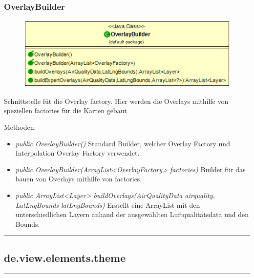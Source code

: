 \subsubsection{OverlayBuilder}
\begin{minipage}{0.5\textwidth}
    \begin{figure}[H]
        {\centering\includegraphics[scale = 0.5
        ]{media/view/factory/OverlayBuilder_Class.png}}
    \end{figure}
    \end{minipage} \hfill
    \begin{minipage}{0.4\textwidth}
Schnittstelle füt die Overlay factory. Hier werden die Overlays mithilfe von speziellen factories für die Karten gebaut
\end{minipage}
Methoden: \begin{itemize} [noitemsep]
    \item \emph{public OverlayBuilder()} Standard Builder, welcher Overlay Factory und Interpolation Overlay Factory verwendet.
    \item \emph{public OverlayBuilder(ArrayList<OverlayFactory> factories)} Builder für das bauen von Overlays mithilfe von factories.
    \item \emph{public ArrayList<Layer> buildOverlays(AirQualityData airquality, LatLngBounds latLngBounds)} Erstellt eine ArrayList mit den unterschiedlichen Layern anhand der ausgewählten Luftqualitätsdata und den Bounds.
\end{itemize}


\rule{\textwidth}{0.4pt}
\subsection{de.view.elements.theme}

\rule{\textwidth}{0.4pt}
